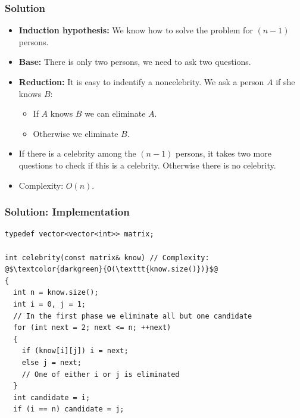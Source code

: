 \documentclass{beamer}
\newcounter{exo}
\newcommand{\exo}{
  \addtocounter{exo}{1}
  Exercice \arabic{exo}
}
\begin{document}

\ifanswers

\begin{frame}
\frametitle{Solution}

\begin{itemize}

\item \textbf{Induction hypothesis:} We know how to solve the problem for $(n-1)$ persons.
\vspace{0.2cm}

\item<2-> \textbf{Base:} There is only two persons, we need to ask two questions.

\item<3-> \textbf{Reduction:} It is easy to indentify a noncelebrity. We ask a person $A$ if she knows $B$:
\begin{itemize}
\item<4-> If $A$ knows $B$ we can eliminate $A$.

\item<4-> Otherwise we eliminate $B$.
\end{itemize}

\vspace{0.2cm}

\item<5-> If there is a celebrity among the $(n-1)$ persons, it takes two more questions to check if this is a celebrity. Otherwise
there is no celebrity.

\item<6-> Complexity: $O(n)$.

\end{itemize}

\end{frame}

\begin{frame}[containsverbatim]
\frametitle{Solution: Implementation}

\scriptsize
\begin{lstlisting}
typedef vector<vector<int>> matrix;

int celebrity(const matrix& know) // Complexity: @$\textcolor{darkgreen}{O(\texttt{know.size()})}$@
{
  int n = know.size();
  int i = 0, j = 1;
  // In the first phase we eliminate all but one candidate
  for (int next = 2; next <= n; ++next)
  {
    if (know[i][j]) i = next;
    else j = next;
    // One of either i or j is eliminated
  }
  int candidate = i;
  if (i == n) candidate = j;
\end{lstlisting}

\end{frame}
\end{document}
